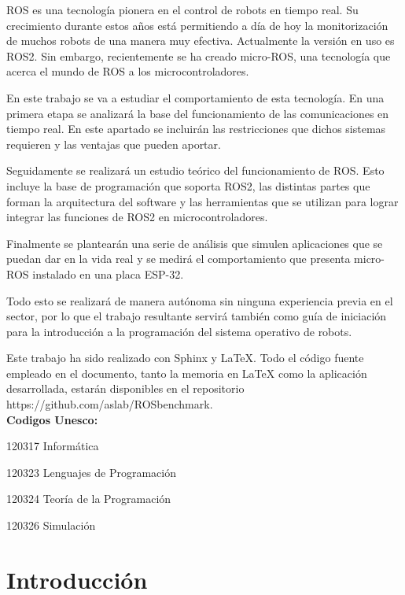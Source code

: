 \documentclass[a4paper,11pt,spanish]{sphinxmanual}
\newcommand\blankpage{%
    \null
    \thispagestyle{empty}%
    \newpage}
\begin{document}
ROS es una tecnología pionera en el control de robots en tiempo real. Su crecimiento durante estos años está permitiendo a día de hoy la monitorización de muchos robots de una manera muy efectiva. Actualmente la versión en uso es ROS2. Sin embargo, recientemente se ha creado micro-ROS, una tecnología que acerca el mundo de ROS a los microcontroladores.

En este trabajo se va a estudiar el comportamiento de esta tecnología. En una primera etapa se analizará la base del funcionamiento de las comunicaciones en tiempo real. En este apartado se incluirán las restricciones que dichos sistemas requieren y las ventajas que pueden aportar.

Seguidamente se realizará un estudio teórico del funcionamiento de ROS. Esto incluye la base de programación que soporta ROS2, las distintas partes que forman la arquitectura del software y las herramientas que se utilizan para lograr integrar las funciones de ROS2 en microcontroladores.

Finalmente se plantearán una serie de análisis que simulen aplicaciones que se puedan dar en la vida real y se medirá el comportamiento que presenta micro-ROS instalado en una placa ESP-32.

Todo esto se realizará de manera autónoma sin ninguna experiencia previa en el sector, por lo que el trabajo resultante servirá también como guía de iniciación para la introducción a la programación del sistema operativo de robots.

Este trabajo ha sido realizado con Sphinx y LaTeX. Todo el código fuente empleado en el documento, tanto la memoria en LaTeX como la aplicación desarrollada, estarán disponibles en el repositorio https://github.com/aslab/ROSbenchmark.\\

\textbf{Codigos Unesco:}

120317 Informática

120323 Lenguajes de Programación

120324 Teoría de la Programación

120326 Simulación

\afterpage{\blankpage}


\pagestyle{plain}
\sphinxtableofcontents
\pagestyle{normal}
\label{\detokenize{index::doc}}



\chapter{Introducción}
\label{\detokenize{introduccion:introduccion}}\label{\detokenize{introduccion::doc}}
\end{document}
